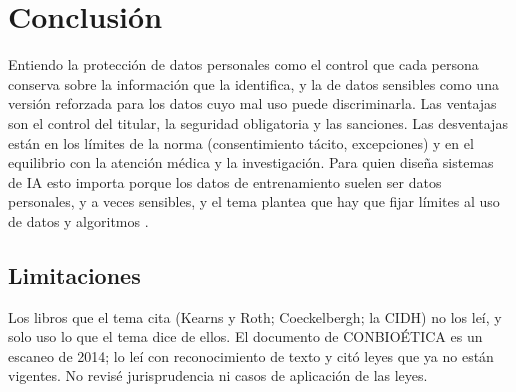 \documentclass[11pt,letterpaper]{article}
\begin{document}
\section{Conclusión}

Entiendo la protección de datos personales como el control que cada persona conserva sobre la información que la identifica, y la de datos sensibles como una versión reforzada para los datos cuyo mal uso puede discriminarla. Las ventajas son el control del titular, la seguridad obligatoria y las sanciones. Las desventajas están en los límites de la norma (consentimiento tácito, excepciones) y en el equilibrio con la atención médica y la investigación. Para quien diseña sistemas de IA esto importa porque los datos de entrenamiento suelen ser datos personales, y a veces sensibles, y el tema plantea que hay que fijar límites al uso de datos y algoritmos \parencite{iae_u6_t61}.

\subsection*{Limitaciones}

Los libros que el tema cita (Kearns y Roth; Coeckelbergh; la CIDH) no los leí, y solo uso lo que el tema dice de ellos. El documento de CONBIOÉTICA es un escaneo de 2014; lo leí con reconocimiento de texto y citó leyes que ya no están vigentes. No revisé jurisprudencia ni casos de aplicación de las leyes.

\end{document}
